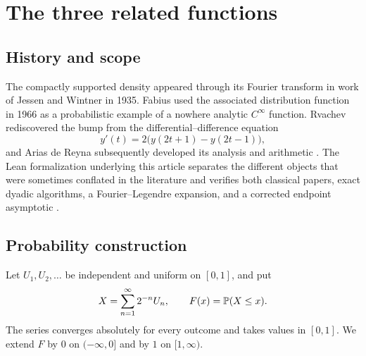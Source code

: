 \documentclass[11pt]{article}
\theoremstyle{definition}
\theoremstyle{remark}
\newcommand{\wt}{\operatorname{wt}_2}\newcommand{\upfun}{\operatorname{up}}
\begin{document}
\section{The three related functions}
\subsection{History and scope}
The compactly supported density appeared through its Fourier transform in work of Jessen and Wintner in 1935.  Fabius used the associated distribution function in 1966 as a probabilistic example of a nowhere analytic $C^\infty$ function.  Rvachev rediscovered the bump from the differential--difference equation
\[
 y'(t)=2\bigl(y(2t+1)-y(2t-1)\bigr),
\]
and Arias de Reyna subsequently developed its analysis and arithmetic \cite{JessenWintner,Fabius1966,RvachevBook,Arias1982,AriasArithmetic}.  The Lean formalization underlying this article separates the different objects that were sometimes conflated in the literature and verifies both classical papers, exact dyadic algorithms, a Fourier--Legendre expansion, and a corrected endpoint asymptotic \cite{ReshetnikovLean,ReshetnikovAudit}.

\begin{center}
\end{center}

\subsection{Probability construction}
Let $U_1,U_2,\ldots$ be independent and uniform on $[0,1]$, and put
\begin{equation}\label{eq:X}
 X=\sum_{n=1}^{\infty}2^{-n}U_n,
 \qquad F(x)=\mathbb P(X\le x).
\end{equation}
The series converges absolutely for every outcome and takes values in $[0,1]$.  We extend $F$ by $0$ on $(-\infty,0]$ and by $1$ on $[1,\infty)$.
\end{document}
